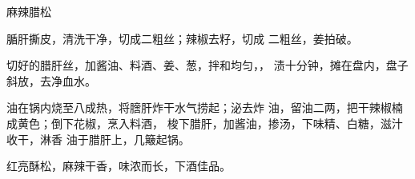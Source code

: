 \begin{recipe}{麻辣腊松}

\ingredients



\cooking

\step 腯肝撕皮，清洗干净，切成二粗丝；辣椒去籽，切成 二粗丝，姜拍破。

\step 切好的腊肝丝，加酱油、料酒、姜、葱，拌和均匀，， 渍十分钟，摊在盘内，盘子斜放，去净血水。

\step 油在锅内烧至八成热，将膪肝炸干水气捞起；泌去炸 油，留油二两，把干辣椒楠成黄色；倒下花椒，烹入料酒， 梭下腊肝，加酱油，掺汤，下味精、白糖，滋汁收干，淋香 油于腊肝上，几簸起锅。

\notes

红亮酥松，麻辣干香，味浓而长，下酒佳品。

\end{recipe}

